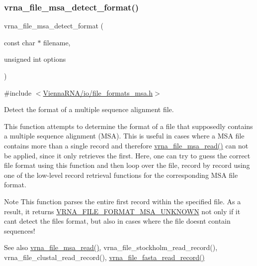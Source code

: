 \mbox{\label{group__file__formats__msa_ga627ac281b5f11c63861726e6472626c9}} 
\subsubsection{\texorpdfstring{vrna\+\_\+file\+\_\+msa\+\_\+detect\+\_\+format()}{vrna\_file\_msa\_detect\_format()}}
{\footnotesize\ttfamily vrna\+\_\+file\+\_\+msa\+\_\+detect\+\_\+format (\begin{DoxyParamCaption}\item[{const char $\ast$}]{filename,  }\item[{unsigned int}]{options }\end{DoxyParamCaption})}



{\ttfamily \#include $<$\hyperlink{io_2file__formats__msa_8h}{Vienna\+R\+N\+A/io/file\+\_\+formats\+\_\+msa.\+h}$>$}



Detect the format of a multiple sequence alignment file. 

This function attempts to determine the format of a file that supposedly contains a multiple sequence alignment (M\+SA). This is useful in cases where a M\+SA file contains more than a single record and therefore \hyperlink{group__file__formats__msa_ga08a01c40ac5f5e0e04e9ae2258c99aa6}{vrna\+\_\+file\+\_\+msa\+\_\+read()} can not be applied, since it only retrieves the first. Here, one can try to guess the correct file format using this function and then loop over the file, record by record using one of the low-\/level record retrieval functions for the corresponding M\+SA file format.

\begin{DoxyNote}{Note}
This function parses the entire first record within the specified file. As a result, it returns \hyperlink{group__file__formats__msa_gabdc948f547e550125de3e7c65878400c}{V\+R\+N\+A\+\_\+\+F\+I\+L\+E\+\_\+\+F\+O\+R\+M\+A\+T\+\_\+\+M\+S\+A\+\_\+\+U\+N\+K\+N\+O\+WN} not only if it can\textquotesingle{}t detect the file\textquotesingle{}s format, but also in cases where the file doesn\textquotesingle{}t contain sequences!
\end{DoxyNote}
\begin{DoxySeeAlso}{See also}
\hyperlink{group__file__formats__msa_ga08a01c40ac5f5e0e04e9ae2258c99aa6}{vrna\+\_\+file\+\_\+msa\+\_\+read()}, vrna\+\_\+file\+\_\+stockholm\+\_\+read\+\_\+record(), vrna\+\_\+file\+\_\+clustal\+\_\+read\+\_\+record(), \hyperlink{group__file__formats_ga8cfb7e271efc9e1f34640acb85475639}{vrna\+\_\+file\+\_\+fasta\+\_\+read\+\_\+record()}
\end{DoxySeeAlso}

